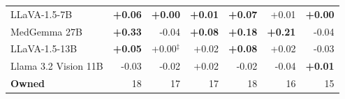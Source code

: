 \begin{table}[h]
\begin{tabular}{lrrrrrr}
LLaVA-1.5-7B & \cellcolor{cfSlate2}\textbf{+0.06} & \cellcolor{cfSlate1}\textbf{+0.00} & \cellcolor{cfSlate1}\textbf{+0.01} & \cellcolor{cfSlate2}\textbf{+0.07} & \cellcolor{cfSlate1}+0.01 & \cellcolor{cfSlate1}\textbf{+0.00} \\
MedGemma 27B & \cellcolor{cfSlate4}\textbf{+0.33} & \cellcolor{cfTerra2}-0.04 & \cellcolor{cfSlate2}\textbf{+0.08} & \cellcolor{cfSlate3}\textbf{+0.18} & \cellcolor{cfSlate3}\textbf{+0.21} & \cellcolor{cfTerra2}-0.04 \\
LLaVA-1.5-13B & \cellcolor{cfSlate2}\textbf{+0.05} & \cellcolor{cfSlate1}+0.00$^{\ddagger}$ & \cellcolor{cfSlate1}+0.02 & \cellcolor{cfSlate2}\textbf{+0.08} & \cellcolor{cfSlate1}+0.02 & \cellcolor{cfTerra2}-0.03 \\
Llama 3.2 Vision 11B & \cellcolor{cfTerra2}-0.03 & \cellcolor{cfTerra2}-0.02 & \cellcolor{cfSlate2}+0.02 & \cellcolor{cfTerra1}-0.02 & \cellcolor{cfTerra2}-0.04 & \cellcolor{cfSlate1}\textbf{+0.01} \\
\midrule
\textbf{Owned} & 18 & 17 & 17 & 18 & 16 & 15 \\
\bottomrule
\end{tabular}
\end{table}
